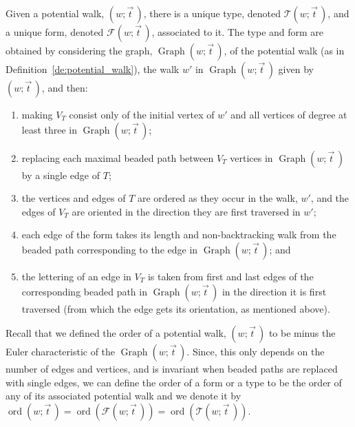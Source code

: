 \documentclass{memo-l}
\theoremstyle{plain}
\theoremstyle{definition}
\numberwithin{section}{chapter}
\numberwithin{equation}{chapter}
\DeclareMathOperator{\ord}{ord}
\DeclareMathOperator{\Graph}{Graph}
\newcommand{\potwalk}{(w;\vec t\,)}
\theoremstyle{plain}
\theoremstyle{definition}
\newcommand\cC{\mathcal{C}}
\newcommand\cF{\mathcal{F}}
\newcommand\cT{\mathcal{T}}
\begin{document}
Given a potential walk, \( \potwalk \), there is a unique type, denoted \(
\cT\potwalk \), and a unique
form, denoted \( \cF\potwalk
\), associated to it. 
The type and form are obtained by
considering the graph, $\Graph\potwalk$, of the potential
walk (as in Definition~\ref{de:potential_walk}), the walk $w'$
in $\Graph\potwalk$ given by $\potwalk$, and then:
\begin{enumerate}
\item making $V_T$ consist only of the initial vertex of $w'$ and
all vertices of degree at least three in $\Graph\potwalk$;
\item replacing each maximal beaded path between $V_T$ vertices
in $\Graph\potwalk$ by a single edge of $T$;
\item the vertices and edges of $T$
are ordered as they occur in the walk, $w'$, and the edges of $V_T$
are oriented in the direction they are first traversed in $w'$;
\item each edge 
of the form takes its length and 
non-backtracking walk from the beaded path corresponding to the edge 
in $\Graph\potwalk$; and
\item the lettering of an edge in $V_T$ is taken from
first and last edges of the
corresponding beaded path in $\Graph\potwalk$ in the direction it is
first traversed (from which the edge gets its orientation, as 
mentioned above).
\end{enumerate}

Recall that we defined the order of a potential walk, \( \potwalk \) to be
minus the Euler characteristic of the $\Graph\potwalk$.
Since, this only depends on the
number of edges and vertices, and is invariant when beaded paths are
replaced with single edges, we
can define the order of a form or a type to be the order of any of its
associated potential walk and we denote it by \( \ord\potwalk =
\ord(\cF\potwalk) = \ord(\cT\potwalk) \).
\end{document}
